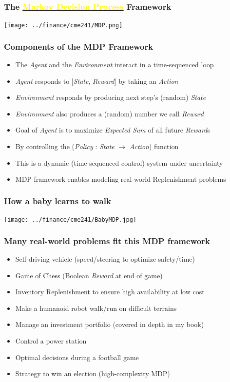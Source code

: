\documentclass[handout]{beamer}
\begin{document}
\begin{frame}
\frametitle{The \href{https://en.wikipedia.org/wiki/Markov_decision_process}{\underline{\textcolor{yellow}{Markov Decision Process}}} Framework}
\texttt{[image: ../finance/cme241/MDP.png]}
\end{frame}

\begin{frame}
\frametitle{Components of the MDP Framework}
\pause
\begin{itemize}[<+->]
\item The {\em Agent} and the {\em Environment} interact in a time-sequenced loop
\item {\em Agent} responds to [{\em State}, {\em Reward}] by taking an {\em Action}
\item {\em Environment} responds by producing next step's (random) {\em State}
\item {\em Environment} also produces a (random) number we call {\em Reward}
\item Goal of {\em Agent} is to maximize {\em Expected Sum} of all future {\em Reward}s
\item By controlling the ({\em Policy} : {\em State} $\rightarrow$ {\em Action}) function
\item This is a dynamic (time-sequenced control) system under uncertainty
\item MDP framework enables modeling real-world Replenishment problems
\end{itemize}
\end{frame}

\begin{frame}
\frametitle{How a baby learns to walk}
\texttt{[image: ../finance/cme241/BabyMDP.jpg]}
\end{frame}

\begin{frame}
\frametitle{Many real-world problems fit this MDP framework}
\pause
\begin{itemize}[<+->]
\item Self-driving vehicle (speed/steering to optimize safety/time)
\item Game of Chess (Boolean {\em Reward} at end of game)
\item Inventory Replenishment to ensure high availability at low cost
\item Make a humanoid robot walk/run on difficult terrains
\item Manage an investment portfolio (covered in depth in my book)
\item Control a power station
\item Optimal decisions during a football game
\item Strategy to win an election (high-complexity MDP)
\end{itemize}
\end{frame}
\end{document}
